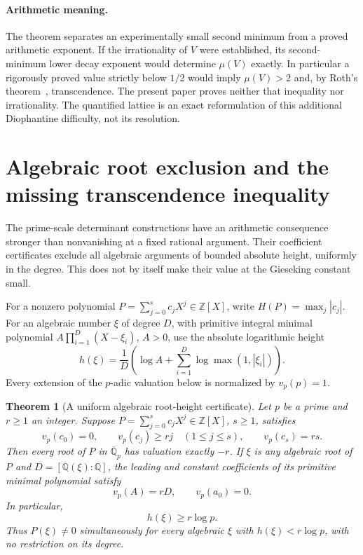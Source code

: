 \documentclass[11pt,a4paper]{article}
\numberwithin{equation}{section}
\newtheorem{theorem}{Theorem}[section]
\theoremstyle{definition}\newtheorem{definition}[theorem]{Definition}
\theoremstyle{remark}\newtheorem{remark}[theorem]{Remark}
\begin{document}
\paragraph{Arithmetic meaning.}
The theorem separates an experimentally small second minimum from a
proved arithmetic exponent. If the irrationality of $V$ were established,
its second-minimum lower decay exponent would determine $\mu(V)$ exactly.
In particular a rigorously proved value strictly below $1/2$ would imply
$\mu(V)>2$ and, by Roth's theorem~\cite{Roth55}, transcendence. The present paper proves
neither that inequality nor irrationality. The quantified lattice is an
exact reformulation of this additional Diophantine difficulty, not its
resolution.


\section{Algebraic root exclusion and the missing transcendence inequality}
\label{alg:sec:algebraic-exclusion}

The prime-scale determinant constructions have an arithmetic consequence
stronger than nonvanishing at a fixed rational argument. Their coefficient
certificates exclude all algebraic arguments of bounded absolute height,
uniformly in the degree. This does not by itself make their value at the
Gieseking constant small.

For a nonzero polynomial $P=\sum_{j=0}^s c_jX^j\in\mathbb Z[X]$, write
$H(P)=\max_j|c_j|$. For an algebraic number $\xi$ of degree $D$, with
primitive integral minimal polynomial
$A\prod_{i=1}^D(X-\xi_i)$, $A>0$, use the absolute logarithmic height
\[
 h(\xi)=\frac1D\left(\log A+
               \sum_{i=1}^D\log\max(1,|\xi_i|)\right).
\]
Every extension of the $p$-adic valuation below is normalized by $v_p(p)=1$.

\begin{theorem}[A uniform algebraic root-height certificate]
\label{alg:thm:root-height}
Let $p$ be a prime and $r\ge1$ an integer. Suppose
$P=\sum_{j=0}^s c_jX^j\in\mathbb Z[X]$, $s\ge1$, satisfies
\begin{equation}\label{alg:eq:weighted-primitive}
 v_p(c_0)=0,\qquad v_p(c_j)\ge rj\quad(1\le j\le s),
 \qquad v_p(c_s)=rs.
\end{equation}
Then every root of $P$ in $\overline{\mathbb Q}_p$ has valuation exactly
$-r$. If $\xi$ is any algebraic root of $P$ and $D=[\mathbb Q(\xi):\mathbb Q]$,
the leading and constant coefficients of its primitive minimal polynomial
satisfy
\[
 v_p(A)=rD,\qquad v_p(a_0)=0.
\]
In particular,
\begin{equation}\label{alg:eq:height-exclusion}
 h(\xi)\ge r\log p.
\end{equation}
Thus $P(\xi)\ne0$ simultaneously for every algebraic $\xi$ with
$h(\xi)<r\log p$, with no restriction on its degree.
\end{theorem}
\end{document}
